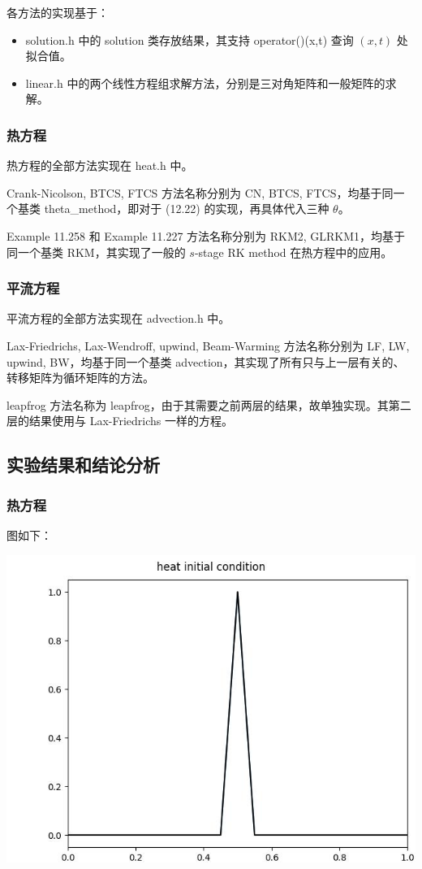 \documentclass[12pt]{ctexart}
\begin{document}
各方法的实现基于：

\begin{itemize}
	\item solution.h 中的 solution 类存放结果，其支持 operator()(x,t) 查询 $(x,t)$ 处拟合值。
	\item linear.h 中的两个线性方程组求解方法，分别是三对角矩阵和一般矩阵的求解。
\end{itemize}

\subsubsection*{热方程}

热方程的全部方法实现在 heat.h 中。

Crank-Nicolson,  BTCS, FTCS 方法名称分别为 CN, BTCS, FTCS，均基于同一个基类 theta\_method，即对于 (12.22) 的实现，再具体代入三种 $\theta$。

Example 11.258 和 Example 11.227 方法名称分别为 RKM2, GLRKM1，均基于同一个基类 RKM，其实现了一般的 $s$-stage RK method 在热方程中的应用。

\subsubsection*{平流方程}

平流方程的全部方法实现在 advection.h 中。

Lax-Friedrichs,  Lax-Wendroff, upwind, Beam-Warming 方法名称分别为 LF, LW, upwind, BW，均基于同一个基类 advection，其实现了所有只与上一层有关的、转移矩阵为循环矩阵的方法。

leapfrog 方法名称为 leapfrog，由于其需要之前两层的结果，故单独实现。其第二层的结果使用与 Lax-Friedrichs 一样的方程。

\subsection*{实验结果和结论分析}

\subsubsection*{热方程}

图如下：

\includegraphics[scale=1.05]{heat initial condition.jpg}
\end{document}

